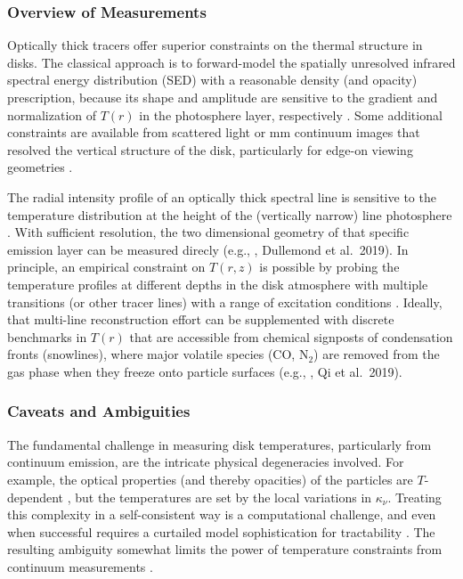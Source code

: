 \documentclass[a4paper]{ar-1col}
\begin{document}
\subsubsection{Overview of Measurements}
Optically thick tracers offer superior constraints on the thermal structure in disks.  The classical approach is to forward-model the spatially unresolved infrared spectral energy distribution (SED) with a reasonable density (and opacity) prescription, because its shape and amplitude are sensitive to the gradient and normalization of $T(r)$ in the photosphere layer, respectively \citep{adams90,chiang97,dalessio98}.  Some additional constraints are available from scattered light or mm continuum images that resolved the vertical structure of the disk, particularly for edge-on viewing geometries \citep[e.g.,][]{stapelfeldt98,lee17}.

The radial intensity profile of an optically thick spectral line is sensitive to the temperature distribution at the height of the (vertically narrow) line photosphere \citep[e.g.,][]{beckwith93,dutrey14,weaver18}.  With sufficient resolution, the two dimensional geometry of that specific emission layer can be measured direcly (e.g., \citealt{rosenfeld13a,pinte18}, Dullemond et al.~2019).  In principle, an empirical constraint on $T(r,z)$ is possible by probing the temperature profiles at different depths in the disk atmosphere with multiple transitions (or other tracer lines) with a range of excitation conditions \citep[e.g.,][]{dartois03,qi04,schwarz16}.  Ideally, that multi-line reconstruction effort can be supplemented with discrete benchmarks in $T(r)$ that are accessible from chemical signposts of condensation fronts (snowlines), where major volatile species (CO, N$_2$) are removed from the gas phase when they freeze onto particle surfaces (e.g., \citealt{qi11,qi13,qi15}, Qi et al.~2019).    


\subsubsection{Caveats and Ambiguities}
The fundamental challenge in measuring disk temperatures, particularly from continuum emission, are the intricate physical degeneracies involved.  For example, the optical properties (and thereby opacities) of the particles are $T$-dependent \citep[e.g.,][]{boudet05,demyk17}, but the temperatures are set by the local variations in $\kappa_\nu$.  Treating this complexity in a self-consistent way is a computational challenge, and even when successful requires a curtailed model sophistication for tractability \citep[e.g.,][]{woitke16}.  The resulting ambiguity somewhat limits the power of temperature constraints from continuum measurements \citep[e.g.,][]{heese17}.  
\end{document}

